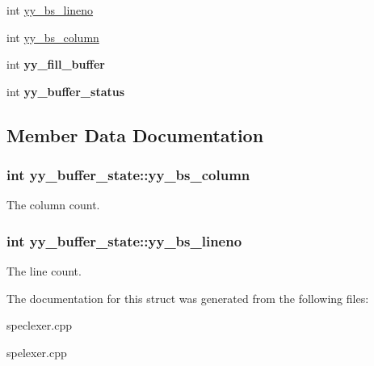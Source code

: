 \begin{DoxyCompactItemize}
\item 
int \hyperlink{structyy__buffer__state_a818e94bc9c766e683c60df1e9fd01199}{yy\+\_\+bs\+\_\+lineno}
\item 
int \hyperlink{structyy__buffer__state_a10c4fcd8be759e6bf11e6d3e8cdb0307}{yy\+\_\+bs\+\_\+column}
\item 
int {\bfseries yy\+\_\+fill\+\_\+buffer}\hypertarget{structyy__buffer__state_a63d2afbb1d79a3fc63df9e12626f827d}{}\label{structyy__buffer__state_a63d2afbb1d79a3fc63df9e12626f827d}

\item 
int {\bfseries yy\+\_\+buffer\+\_\+status}\hypertarget{structyy__buffer__state_a70fd925d37a2f0454fbd0def675d106c}{}\label{structyy__buffer__state_a70fd925d37a2f0454fbd0def675d106c}

\end{DoxyCompactItemize}


\subsection{Member Data Documentation}
\subsubsection[{\texorpdfstring{yy\+\_\+bs\+\_\+column}{yy_bs_column}}]{\setlength{\rightskip}{0pt plus 5cm}int yy\+\_\+buffer\+\_\+state\+::yy\+\_\+bs\+\_\+column}\hypertarget{structyy__buffer__state_a10c4fcd8be759e6bf11e6d3e8cdb0307}{}\label{structyy__buffer__state_a10c4fcd8be759e6bf11e6d3e8cdb0307}
The column count. 
\subsubsection[{\texorpdfstring{yy\+\_\+bs\+\_\+lineno}{yy_bs_lineno}}]{\setlength{\rightskip}{0pt plus 5cm}int yy\+\_\+buffer\+\_\+state\+::yy\+\_\+bs\+\_\+lineno}\hypertarget{structyy__buffer__state_a818e94bc9c766e683c60df1e9fd01199}{}\label{structyy__buffer__state_a818e94bc9c766e683c60df1e9fd01199}
The line count. 

The documentation for this struct was generated from the following files\+:\begin{DoxyCompactItemize}
\item 
speclexer.\+cpp\item 
spelexer.\+cpp\end{DoxyCompactItemize}
